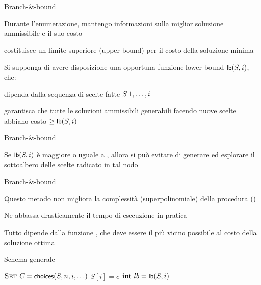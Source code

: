\begin{frame}{Branch-\&-bound}

\BIL
\item Durante l'enumerazione, mantengo informazioni sulla miglior
soluzione ammissibile \Minsol e il suo costo \Mincost
\item \Mincost costituisce un \alert{limite superiore} (\alert{upper bound})
per il costo della soluzione minima
\EIL

\BIL
\item Si supponga di avere disposizione una opportuna funzione \alert{lower bound} $\textsf{{\small lb}}(S, i)$, che:
  \BI 
  \item dipenda dalla sequenza di scelte fatte $S[1, \ldots,i]$
  \item garantisca che tutte le soluzioni ammissibili generabili facendo
nuove scelte abbiano costo $\geq \textsf{{\small lb}}(S, i)$
  \EI
\EIL
    
\end{frame}

\begin{frame}{Branch-\&-bound}

\vspace{-9pt}
\begin{block}{}
Se $\textsf{{\small lb}}(S, i)$ è maggiore o uguale a \Mincost, allora si può
evitare di generare ed esplorare il sottoalbero delle scelte radicato in tal
nodo
\end{block}

\end{frame}

\begin{frame}{Branch-\&-bound}

\BIL
\item Questo metodo non migliora la complessità (superpolinomiale) della procedura \enumerazione()
\item Ne abbassa drasticamente il tempo di esecuzione in pratica
\item Tutto dipende dalla funzione \LB, che deve essere il più vicino possibile al costo della soluzione ottima
\EIL

\end{frame}

\begin{frame}{Schema generale}

\vspace{-12pt}
\begin{Procedure}
\caption[A]{\branchbound($\Item[\,]\ S$, \INTEGER $n$, \INTEGER\ $i$, \mldots)}
$\textsc{Set}\ C = \textsf{{\small choices}}(S, n, i, \ldots)$
{
  $S[i] = c$\;
  $\INTEGER\ lb = \LB(S, i)$\;
}
\end{Procedure}

\end{frame}


